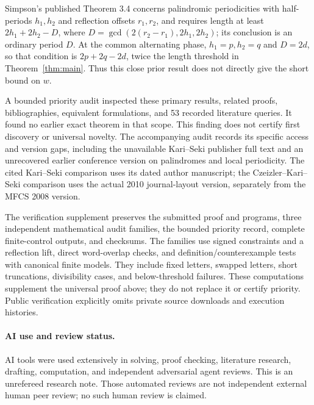 \documentclass[10pt]{article}
\begin{document}
Simpson's published Theorem 3.4 \cite{Simpson} concerns palindromic
periodicities with half-periods $h_1,h_2$ and reflection offsets
$r_1,r_2$, and requires length at least
$2h_1+2h_2-D$, where
$D=\gcd(2(r_2-r_1),2h_1,2h_2)$; its conclusion is an ordinary
period $D$. At the common alternating phase, $h_1=p,h_2=q$ and
$D=2d$, so that condition is $2p+2q-2d$, twice the length threshold
in Theorem~\ref{thm:main}. Thus this close prior result does not
directly give the short bound on $w$.

A bounded priority audit inspected these primary results, related
proofs, bibliographies, equivalent formulations, and 53 recorded
literature queries. It found no earlier exact theorem in that scope.
This finding does not certify first discovery or universal novelty.
The accompanying audit records its specific access and version gaps,
including the unavailable Kari--Seki publisher full text and an
unrecovered earlier conference version on palindromes and local
periodicity. The cited Kari--Seki comparison uses its dated author
manuscript; the Czeizler--Kari--Seki comparison uses the actual
2010 journal-layout version, separately from the MFCS 2008 version.

The verification supplement preserves the submitted proof and
programs, three independent mathematical audit families, the bounded
priority record, complete finite-control outputs, and checksums.
The families use signed constraints and a reflection lift, direct
word-overlap checks, and definition/counterexample tests with
canonical finite models. They include fixed letters, swapped letters,
short truncations, divisibility cases, and below-threshold failures.
These computations supplement the universal proof above; they do not
replace it or certify priority. Public verification explicitly omits
private source downloads and execution histories.

\paragraph{AI use and review status.}
AI tools were used extensively in solving, proof checking, literature
research, drafting, computation, and independent adversarial agent
reviews. This is an unrefereed research note. Those automated reviews
are not independent external human peer review; no such human review
is claimed.
\end{document}
